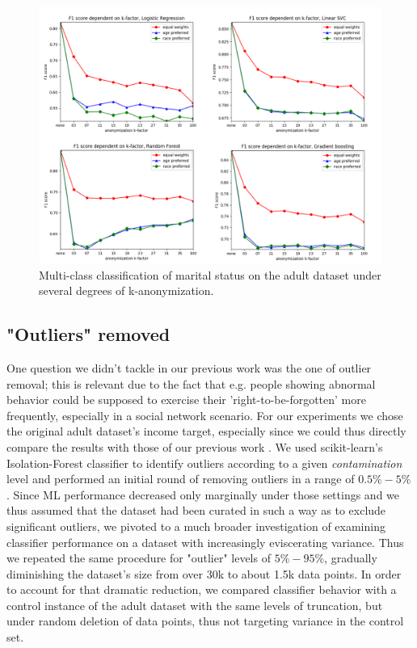 \documentclass{llncs}
\begin{document}
\begin{figure}[H]
	\centering
	\includegraphics[width=1\textwidth]{figures/anonymization/adults_marital_status/anon_marital_combined}
	\caption{Multi-class classification of marital status on the adult dataset under several degrees of k-anonymization.}
	\label{fig:results_anonymization_marital_status}
\end{figure}




\subsection{"Outliers" removed}
\label{ssect:outliers_removed}

One question we didn't tackle in our previous work was the one of outlier removal; this is relevant due to the fact that e.g. people showing abnormal behavior could be supposed to exercise their 'right-to-be-forgotten' more frequently, especially in a social network scenario. For our experiments we chose the original adult dataset's income target, especially since we could thus directly compare the results with those of our previous work \cite{malle2016right}. We used scikit-learn's Isolation-Forest classifier to identify outliers according to a given \textit{contamination} level and performed an initial round of removing outliers in a range of $0.5\% - 5\%$. Since ML performance decreased only marginally under those settings and we thus assumed that the dataset had been curated in such a way as to exclude significant outliers, we pivoted to a much broader investigation of examining classifier performance on a dataset with increasingly eviscerating variance. Thus we repeated the same procedure for "outlier" levels of $5\% - 95\%$, gradually diminishing the dataset's size from over 30k to about 1.5k data points. In order to account for that dramatic reduction, we compared classifier behavior with a control instance of the adult dataset with the same levels of truncation, but under random deletion of data points, thus not targeting variance in the control set. 
\end{document}
